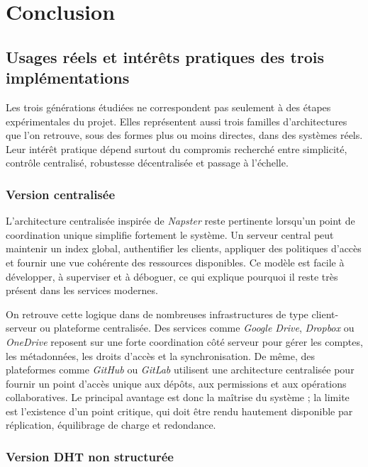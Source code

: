 \section{Conclusion}

\subsection{Usages réels et intérêts pratiques des trois implémentations}

Les trois générations étudiées ne correspondent pas seulement à des étapes expérimentales du projet. Elles représentent aussi trois familles d'architectures que l'on retrouve, sous des formes plus ou moins directes, dans des systèmes réels. Leur intérêt pratique dépend surtout du compromis recherché entre simplicité, contrôle centralisé, robustesse décentralisée et passage à l'échelle.

\subsubsection{Version centralisée}

L'architecture centralisée inspirée de \textit{Napster} reste pertinente lorsqu'un point de coordination unique simplifie fortement le système. Un serveur central peut maintenir un index global, authentifier les clients, appliquer des politiques d'accès et fournir une vue cohérente des ressources disponibles. Ce modèle est facile à développer, à superviser et à déboguer, ce qui explique pourquoi il reste très présent dans les services modernes.

On retrouve cette logique dans de nombreuses infrastructures de type client-serveur ou plateforme centralisée. Des services comme \textit{Google Drive}, \textit{Dropbox} ou \textit{OneDrive} reposent sur une forte coordination côté serveur pour gérer les comptes, les métadonnées, les droits d'accès et la synchronisation. De même, des plateformes comme \textit{GitHub} ou \textit{GitLab} utilisent une architecture centralisée pour fournir un point d'accès unique aux dépôts, aux permissions et aux opérations collaboratives. Le principal avantage est donc la maîtrise du système ; la limite est l'existence d'un point critique, qui doit être rendu hautement disponible par réplication, équilibrage de charge et redondance.

\subsubsection{Version DHT non structurée}

